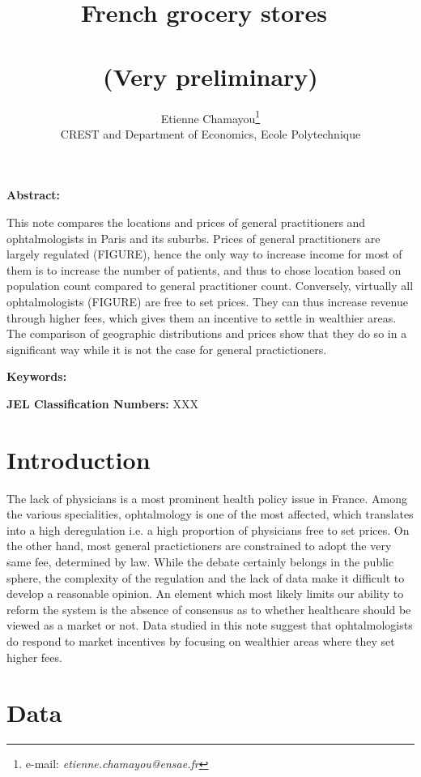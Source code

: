 \documentclass[11pt]{article}
\begin{document}
\title{French grocery stores\ \\ \ \\(Very preliminary)}
\author{Etienne Chamayou\thanks{e-mail:
\textit{etienne.chamayou@ensae.fr}}\medskip\\{\normalsize CREST and Department of Economics, Ecole Polytechnique }}
\maketitle

\sloppy%

\onehalfspacing

\textbf{Abstract:}

This note compares the locations and prices of general practitioners and ophtalmologists in Paris and its suburbs. Prices of general practitioners are largely regulated (FIGURE), hence the only way to increase income for most of them is to increase the number of patients, and thus to chose location based on population count compared to general practitioner count. Conversely, virtually all ophtalmologists (FIGURE) are free to set prices. They can thus increase revenue through higher fees, which gives them an incentive to settle in wealthier areas. The comparison of geographic distributions and prices show that they do so in a significant way while it is not the case for general practictioners.

\strut

\textbf{Keywords:}

\strut

\textbf{JEL Classification Numbers:} XXX

\pagebreak%
\doublespacing

\section{Introduction}

The lack of physicians is a most prominent health policy issue in France. Among the various specialities, ophtalmology is one of the most affected, which translates into a high deregulation i.e. a high proportion of physicians free to set prices. On the other hand, most general practictioners are constrained to adopt the very same fee, determined by law. While the debate certainly belongs in the public sphere, the complexity of the regulation and the lack of data make it difficult to develop a reasonable opinion. An element which most likely limits our ability to reform the system is the absence of consensus as to whether healthcare should be viewed as a market or not. Data studied in this note suggest that ophtalmologists do respond to market incentives by focusing on wealthier areas where they set higher fees.

\section{Data}


\clearpage

\appendix
\end{document}
